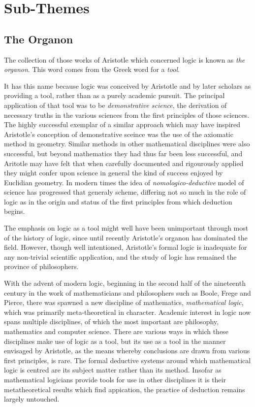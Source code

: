 \section{Sub-Themes}

\subsection{The Organon}

The collection of those works of Aristotle which concerned logic is
known as {\it the organon}.
This word comes from the Greek word for a {\it tool}.

It has this name because logic was conceived by Aristotle and by later
scholars as providing a tool, rather than as a purely academic
pursuit.
The principal application of that tool was to be \emph{demonstrative
science}, the derivation of necessary truths in the various sciences
from the first principles of those sciences.
The highly successful exemplar of a similar approach which may have inspired Aristotle's conception of demonstrative sceince was the use of the axiomatic method in geometry.
Similar methods in other mathematical disciplines were also successful, but beyond mathematics they had thus far been less successful, and Aritotle may have felt that when carefully documented and rigourously applied they might confer upon science in general the kind of success enjoyed by Euclidian geometry.  
In modern times the idea of {\it nomologico-deductive} model of science has progressed that generaly scheme, differing not so much in the role of logic as in the origin and
status of the first principles from which deduction begins.
 
The emphasis on logic as a tool might well have been unimportant
through most of the history of logic, since until recently Aristotle's
organon has dominated the field.
However, though well intentioned, Aristotle's formal logic is
inadequate for any non-trivial scientific application, and the study
of logic has remained the province of philosophers.

With the advent of modern logic, beginning in the second half of the
nineteenth century in the work of mathematicians and philosophers such as Boole,
Frege and Pierce, there was spawned a new discipline of mathematics,
{\it mathematical logic}, which was primarily meta-theoretical in
character.
Academic interest in logic now spans multiple disciplines, of which
the most important are philosophy, mathematics and computer science.
There are various ways in which these disciplines make use of
logic as a tool, but its use as a tool in the manner envisaged by
Aristotle, as the means whereby conclusions are drawn from various
first principles, is rare.
The formal deductive systems around which mathematical logic is centred
are its subject matter rather than its method.
Insofar as mathematical logicians provide tools for use in other
disciplines it is their metatheoretical results which find 
appication, the practice of deduction remains largely untouched.

